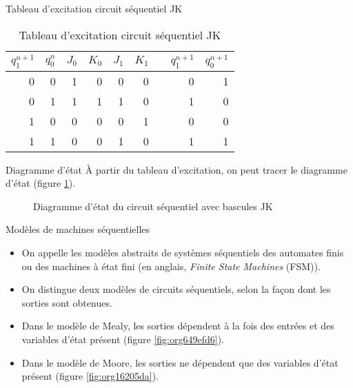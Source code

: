 \documentclass[presentation]{beamer}
\begin{document}
\begin{frame}[label={sec:org999d297}]{Tableau d'excitation circuit séquentiel JK}
\begin{table}[htbp]
\caption{\label{tab:orgc11b9d8}Tableau d'excitation circuit séquentiel JK}
\centering
\begin{tabular}{rrrrrrlrr}
\(q_1^{n+1}\) & \(q_0^n\) & \(J_0\) & \(K_0\) & \(J_1\) & \(K_1\) &  & \(q_1^{n+1}\) & \(q_0^{n+1}\)\\[0pt]
\hline
0 & 0 & 1 & 0 & 0 & 0 &  & 0 & 1\\[0pt]
0 & 1 & 1 & 1 & 1 & 0 &  & 1 & 0\\[0pt]
1 & 0 & 0 & 0 & 0 & 1 &  & 0 & 0\\[0pt]
1 & 1 & 0 & 0 & 1 & 0 &  & 1 & 1\\[0pt]
\end{tabular}
\end{table}
\end{frame}

\begin{frame}[label={sec:org45ff521}]{Diagramme d'état}
À partir du tableau d'excitation, on peut tracer le diagramme d'état
(figure \ref{fig:org55cc3e7}).

\begin{figure}[htbp]
\centering

\caption{\label{fig:org55cc3e7}Diagramme d'état du circuit séquentiel avec bascules JK}
\end{figure}
\end{frame}

\begin{frame}[label={sec:org9b4119c}]{Modèles de machines séquentielles}
\begin{itemize}
\item On appelle les modèles abstraits de systèmes séquentiels des \alert{automates finis} ou des \alert{machines à état fini} (en anglais, \emph{Finite State Machines} (FSM)).

\item On distingue deux modèles de circuits séquentiels, selon la façon dont les sorties sont obtenues.

\item Dans le modèle de Mealy, les sorties dépendent à la fois des entrées et des variables d'état présent (figure \ref{fig:org649efd6}).

\item Dans le modèle de Moore, les sorties ne dépendent que des variables d'état présent (figure \ref{fig:org16205da}).
\end{itemize}
\end{frame}
\end{document}
